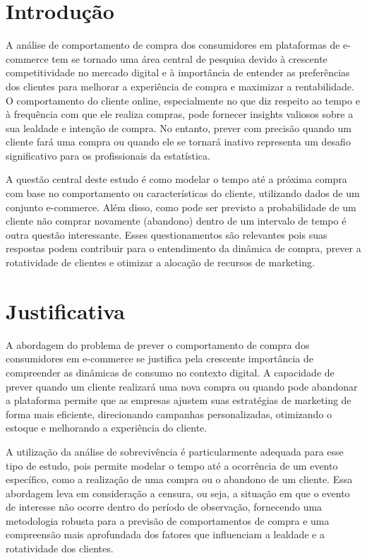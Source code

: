 \section{Introdução}
\label{sec:introducao}

A análise de comportamento de compra dos consumidores em plataformas de e-commerce tem se tornado uma área central de pesquisa devido à crescente competitividade no mercado digital e à importância de entender as preferências dos clientes para melhorar a experiência de compra e maximizar a rentabilidade. O comportamento do cliente online, especialmente no que diz respeito ao tempo e à frequência com que ele realiza compras, pode fornecer insights valiosos sobre a sua lealdade e intenção de compra. No entanto, prever com precisão quando um cliente fará uma compra ou quando ele se tornará inativo representa um desafio significativo para os profissionais da estatística.

A questão central deste estudo é como modelar o tempo até a próxima compra com base no comportamento ou características do cliente, utilizando dados de um conjunto e-commerce. Além disso, como pode ser previsto a probabilidade de um cliente não comprar novamente (abandono) dentro de um intervalo de tempo é outra questão interessante. Esses questionamentos são relevantes pois suas respostas podem contribuir para o entendimento da dinâmica de compra, prever a rotatividade de clientes e otimizar a alocação de recursos de marketing.

\section{Justificativa}
A abordagem do problema de prever o comportamento de compra dos consumidores em e-commerce se justifica pela crescente importância de compreender as dinâmicas de consumo no contexto digital. A capacidade de prever quando um cliente realizará uma nova compra ou quando pode abandonar a plataforma permite que as empresas ajustem suas estratégias de marketing de forma mais eficiente, direcionando campanhas personalizadas, otimizando o estoque e melhorando a experiência do cliente.

A utilização da análise de sobrevivência é particularmente adequada para esse tipo de estudo, pois permite modelar o tempo até a ocorrência de um evento específico, como a realização de uma compra ou o abandono de um cliente. Essa abordagem leva em consideração a censura, ou seja, a situação em que o evento de interesse não ocorre dentro do período de observação, fornecendo uma metodologia robusta para a previsão de comportamentos de compra e uma compreensão mais aprofundada dos fatores que influenciam a lealdade e a rotatividade dos clientes.

